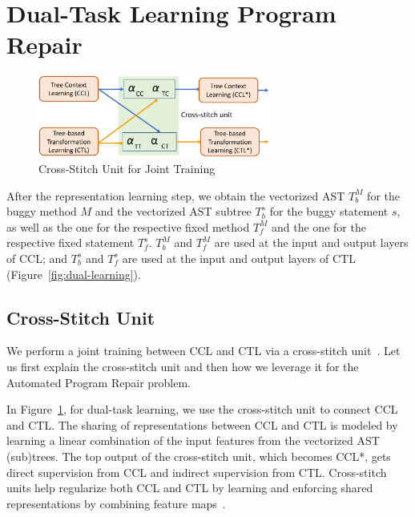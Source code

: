 \section{Dual-Task Learning Program Repair}
\label{sec: dual-learning}
\begin{figure}[t]
	\centering
	\includegraphics[width=3in]{graphs/cross-stitch}
        \vspace{-9pt}
	\caption{Cross-Stitch Unit for Joint Training~\cite{misra2016cross}}
	\label{fig:cross-stitch}
\end{figure}

After the representation learning step, we obtain the vectorized AST
$T^{M}_b$ for the buggy method $M$ and the vectorized AST subtree
$T^{s}_b$ for the buggy statement $s$, as well as the one for the
respective fixed method $T^{M}_f$ and the one for the respective fixed
statement $T^{s}_f$. $T^{M}_b$ and $T^{M}_f$ are used at the input and
output layers of CCL; and $T^{s}_b$ and $T^{s}_f$ are used at the
input and output layers of CTL (Figure~\ref{fig:dual-learning}).



\subsection{Cross-Stitch Unit}

We perform a joint training between CCL and CTL via a cross-stitch
unit~\cite{misra2016cross}. Let us first explain the cross-stitch unit
and then how we leverage it for the Automated Program Repair problem.



In Figure~\ref{fig:cross-stitch}, for dual-task learning, we use the
cross-stitch unit to connect CCL and CTL. The sharing of
representations between CCL and CTL is modeled by learning a
linear combination of the input features from the vectorized AST
(sub)trees. The top output of the cross-stitch unit, which becomes
CCL*, gets direct supervision from CCL and indirect supervision from
CTL. Cross-stitch units help regularize both CCL and CTL by learning
and enforcing shared representations by combining feature
maps~\cite{misra2016cross}.

